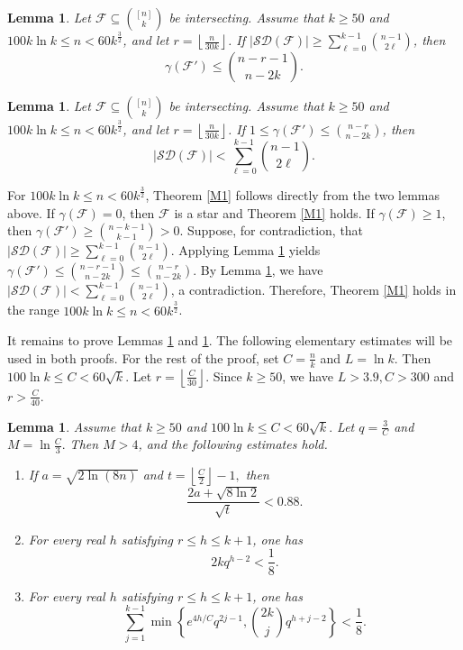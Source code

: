 \documentclass[11pt]{article}
\numberwithin{equation}{section}
\newtheorem{lemma}[theorem]{Lemma}
\begin{document}
\begin{lemma}\label{lem3}
		Let $\mathcal{F}\subseteq \binom{[n]}{k}$ be intersecting. Assume that  $k\ge 50$ and $100 k\ln k \le n< 60k^\frac{3}{2}$, and let $
r = \left\lfloor \frac{n}{30k} \right\rfloor$. If $|\mathcal{SD}(\mathcal{F})|\geq \sum\limits_{\ell=0}^{k-1}\binom{n-1}{2\ell}$,
then 
$$\gamma(\mathcal{F}')\le \binom{n-r-1}{n-2k}.$$
	
	\end{lemma}
	\begin{lemma}\label{lem4}
		Let $\mathcal{F}\subseteq \binom{[n]}{k}$ be intersecting.  Assume that  $k\ge 50$ and $100 k\ln k \le n< 60k^\frac{3}{2}$,  and let $
r = \left\lfloor \frac{n}{30k} \right\rfloor$.
If 
$1\le \gamma(\mathcal{F}')\le \binom{n-r}{n-2k}$, then 
$$
|\mathcal{SD}(\mathcal{F})|< \sum\limits_{\ell=0}^{k-1}\binom{n-1}{2\ell}.
$$
	\end{lemma}

For  $100 k\ln k \le n< 60k^\frac{3}{2}$,  Theorem \ref{M1} follows directly from the two lemmas above. 
 If $\gamma(\mathcal{F}) = 0$, then $\mathcal{F}$ is a  star and Theorem \ref{M1} holds.  If $\gamma(\mathcal{F}) \ge 1$, then $\gamma(\mathcal{F}') \ge \binom{n-k-1}{k-1} > 0$. 
Suppose, for contradiction, that  $|\mathcal{SD}(\mathcal{F})|\geq \sum\limits_{\ell=0}^{k-1}\binom{n-1}{2\ell}$. Applying Lemma \ref{lem3} yields $\gamma(\mathcal{F}') \leq \binom{n-r-1}{n-2k}\leq \binom{n-r}{n-2k}$. By Lemma \ref{lem4}, we have $
|\mathcal{SD}(\mathcal{F})|< \sum\limits_{\ell=0}^{k-1}\binom{n-1}{2\ell}
$,  a contradiction. Therefore, Theorem \ref{M1} holds in the range $100 k\ln k \le n< 60k^\frac{3}{2}$.

It remains to prove Lemmas \ref{lem3} and \ref{lem4}. The following elementary estimates will be used in both proofs.
For the rest of the proof, set  $C = \frac{n}{k}$ and $L=\ln k$.
Then $100 \ln k\leq  C<60\sqrt{k}$.
Let $
r = \left\lfloor \frac{C}{30} \right\rfloor$.
Since $k\geq 50$, we have $L>3.9, C>300$ and $r>\frac{C}{40}$.


\begin{lemma}\label{le5}
Assume that $k\geq 50$ and
$
100\ln k \le C < 60\sqrt{k}.
$
Let
$
q = \frac{3}{C}$ and $M = \ln \frac{C}{3}.
$
Then $M > 4$, and the following estimates hold.

\begin{enumerate}[(1)]
\item If
$
a = \sqrt{2\ln(8n)}$ and $t = \left\lfloor \frac{C}{2} \right\rfloor - 1,
$
then
\[
\frac{2a + \sqrt{8\ln 2}}{\sqrt{t}} < 0.88.
\]

\item For every real $h$ satisfying $r \le h \le k+1$, one has
\[
2k q^{h-2} < \frac{1}{8}.
\]

\item For every real $h$ satisfying $r \le h \le k+1$, one has
\[
\sum_{j=1}^{k-1} \min\left\{ e^{4h/C} q^{2j-1}, \binom{2k}{j} q^{h+j-2} \right\} < \frac{1}{8}.
\]
\end{enumerate}
\end{lemma}
\end{document}
